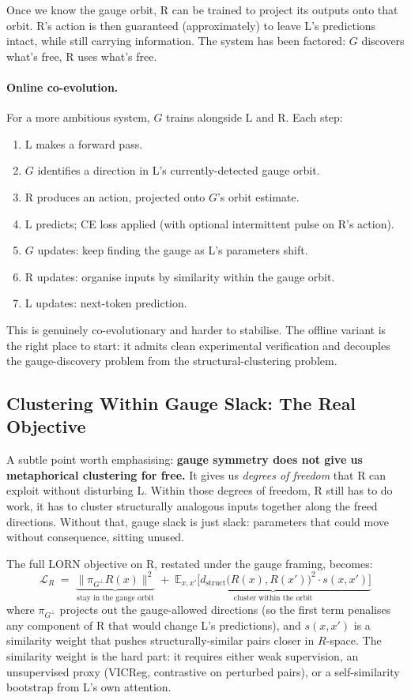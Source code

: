 \documentclass[11pt, a4paper]{article}
\theoremstyle{plain}
\theoremstyle{definition}
\theoremstyle{remark}
\begin{document}
Once we know the gauge orbit, R can be trained to project its outputs onto that orbit.
R's action is then guaranteed (approximately) to leave L's predictions intact, while still carrying information.
The system has been factored: $G$ discovers what's free, R uses what's free.

\paragraph{Online co-evolution.}
For a more ambitious system, $G$ trains alongside L and R.
Each step:
\begin{enumerate}[nosep]
\item L makes a forward pass.
\item $G$ identifies a direction in L's currently-detected gauge orbit.
\item R produces an action, projected onto $G$'s orbit estimate.
\item L predicts; CE loss applied (with optional intermittent pulse on R's action).
\item $G$ updates: keep finding the gauge as L's parameters shift.
\item R updates: organise inputs by similarity within the gauge orbit.
\item L updates: next-token prediction.
\end{enumerate}
This is genuinely co-evolutionary and harder to stabilise.
The offline variant is the right place to start: it admits clean experimental verification and decouples the gauge-discovery problem from the structural-clustering problem.

\subsection{Clustering Within Gauge Slack: The Real Objective}

A subtle point worth emphasising: \textbf{gauge symmetry does not give us metaphorical clustering for free.}
It gives us \emph{degrees of freedom} that R can exploit without disturbing L.
Within those degrees of freedom, R still has to do work, it has to cluster structurally analogous inputs together along the freed directions.
Without that, gauge slack is just slack: parameters that could move without consequence, sitting unused.

The full LORN objective on R, restated under the gauge framing, becomes:
\begin{equation}
\mathcal{L}_R \;=\; \underbrace{\big\| \pi_{G^{\perp}} R(x) \big\|^2}_{\text{stay in the gauge orbit}}
\;+\; \underbrace{\mathbb{E}_{x, x'} \big[ d_{\text{struct}}\!\big(R(x), R(x')\big)^2 \cdot s(x, x') \big]}_{\text{cluster within the orbit}}
\end{equation}
where $\pi_{G^{\perp}}$ projects out the gauge-allowed directions (so the first term penalises any component of R that would change L's predictions), and $s(x, x')$ is a similarity weight that pushes structurally-similar pairs closer in $R$-space.
The similarity weight is the hard part: it requires either weak supervision, an unsupervised proxy (VICReg, contrastive on perturbed pairs), or a self-similarity bootstrap from L's own attention.
\end{document}
